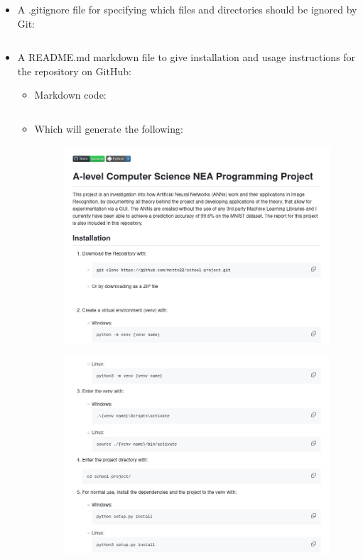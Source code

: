 \documentclass[./project-report/src/latex/project-report.tex]{subfiles}
\begin{document}
\begin{itemize}
    \item A .gitignore file for specifying which files and directories should be ignored by Git:
        \inputminted{text}{./.gitignore}
    \item A README.md markdown file to give installation and usage instructions for the repository on GitHub:
        \begin{itemize}
            \item Markdown code:
                \inputminted{markdown}{./README.md}
            \item Which will generate the following:
                \begin{figure}[h!]
                \centering
                \includegraphics[width=1\textwidth]{./project-report/src/images/readme-1.png}
                \end{figure}
                \pagebreak
                \begin{figure}[h!]
                \centering
                \includegraphics[width=1\textwidth]{./project-report/src/images/readme-2.png}

\end{figure}
\end{itemize}
\end{itemize}
\end{document}
